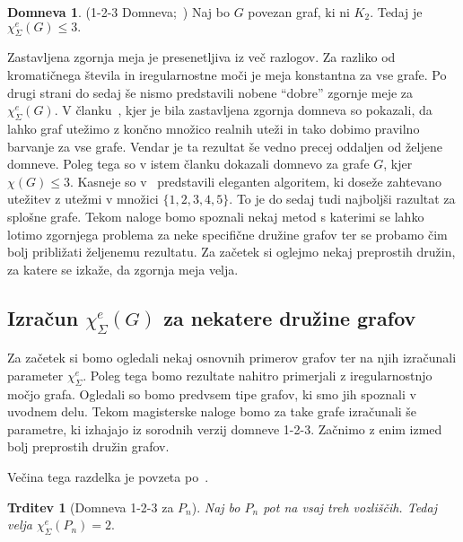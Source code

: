 \documentclass[12pt,a4paper,twoside]{article}
\theoremstyle{definition} %
\newtheorem{domneva}[definicija]{Domneva}
\theoremstyle{plain} %
\newtheorem{trditev}[definicija]{Trditev}
\newcommand{\ec}{\chi_{\Sigma}^e}
\numberwithin{equation}{section}  %
\begin{document}
\begin{domneva} 
	\label{123conjecture}
	(1-2-3 Domneva;~\citet{base}) Naj bo $G$ povezan graf, ki ni $K_2$. Tedaj je $\ec(G) \le 3.$ 
\end{domneva}
Zastavljena zgornja meja je presenetljiva iz več razlogov. Za razliko od kromatičnega števila in iregularnostne moči je meja konstantna za vse grafe. Po drugi strani do sedaj še nismo predstavili nobene ``dobre'' zgornje meje za $\ec(G)$. V članku~\cite{base}, kjer je bila zastavljena zgornja domneva so pokazali, da lahko graf utežimo z končno množico realnih uteži in tako dobimo pravilno barvanje za vse grafe. Vendar je ta rezultat še vedno precej oddaljen od željene domneve. Poleg tega so v istem članku dokazali domnevo za grafe $G$, kjer $\chi(G) \le 3$.
 Kasneje so v~\citet{proof12345} predstavili eleganten algoritem, ki doseže zahtevano utežitev z utežmi v množici $\{1,2,3,4,5\}$. To je do sedaj tudi najboljši razultat za splošne grafe. Tekom naloge bomo spoznali nekaj metod s katerimi se lahko lotimo zgornjega problema za neke specifične družine grafov ter se probamo čim bolj približati željenemu rezultatu. Za začetek si oglejmo nekaj preprostih družin, za katere se izkaže, da zgornja meja velja.

\subsection{Izračun $\ec(G)$ za nekatere družine grafov}

Za začetek si bomo ogledali nekaj osnovnih primerov grafov ter na njih izračunali parameter $\ec$. Poleg tega bomo rezultate nahitro primerjali z iregularnostnjo močjo grafa. Ogledali so bomo predvsem tipe grafov, ki smo jih spoznali v uvodnem delu. Tekom magisterske naloge bomo za take grafe izračunali še parametre, ki izhajajo iz sorodnih verzij domneve 1-2-3. Začnimo z enim izmed bolj preprostih družin grafov.

Večina tega razdelka je povzeta po~\cite{examples}.
\begin{trditev}[Domneva 1-2-3 za $P_n$]
\label{path_e}
Naj bo $P_n$ pot na vsaj treh vozliščih. Tedaj velja $\ec(P_n) = 2.$
\end{trditev}
\end{document}
